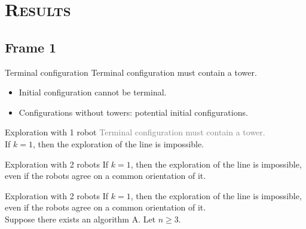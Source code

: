 \documentclass[xcolor=x11names,compress]{beamer}
\makeatletter
\let\beamer@writeslidentry@miniframeson=\beamer@writeslidentry
\def\beamer@writeslidentry@miniframesoff{%
  \expandafter\beamer@ifempty\expandafter{\beamer@framestartpage}{}%
  {%
    \clearpage\beamer@notesactions%
  }
}
\newcommand*{\miniframeson}{\let\beamer@writeslidentry=\beamer@writeslidentry@miniframeson}
\newcommand*{\miniframesoff}{\let\beamer@writeslidentry=\beamer@writeslidentry@miniframesoff}
\renewcommand{\(}{\begin{columns}}
\renewcommand{\)}{\end{columns}}
\newcommand{\<}[1]{\begin{column}{#1}}
\renewcommand{\>}{\end{column}}
\makeatother
\begin{document}
\section{\scshape Results}
\subsection{Frame 1}
\miniframeson
\begin{frame}{Terminal configuration}
Terminal configuration must contain a tower.
\\[0.3in] 
\begin{itemize}
     \item Initial configuration cannot be terminal.
     \item Configurations without towers: potential initial configurations.
    \end{itemize} 
\end{frame}
\begin{frame}{Exploration with 1 robot}
\textcolor{gray}{Terminal configuration must contain a tower.}
\\[0.3in] 
If $k = 1$, then the exploration of the line is impossible. 
\end{frame}
\begin{frame}{Exploration with 2 robots}
If $k = 1$, then the exploration of the line is impossible, even if the robots agree on a common orientation of it. 
\end{frame}
\miniframesoff
\begin{frame}{Exploration with 2 robots}
If $k = 1$, then the exploration of the line is impossible, even if the robots agree on a common orientation of it. 
\\[0.3in] 
Suppose there exists an algorithm A. Let $n\geq3$.


\end{frame}
\end{document}
